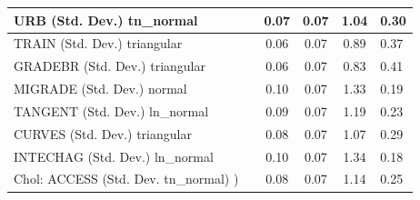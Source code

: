 \begin{table}
\begin{center}
\begin{tabular}{|l|l|c|c|c|l|}
			\hline
			URB (Std. Dev.) tn_normal &  & 0.07 & 0.07 & 1.04 & 0.30 \\
			\hline
			TRAIN (Std. Dev.) triangular &  & 0.06 & 0.07 & 0.89 & 0.37 \\
			\hline
			GRADEBR (Std. Dev.) triangular &  & 0.06 & 0.07 & 0.83 & 0.41 \\
			\hline
			MIGRADE (Std. Dev.) normal &  & 0.10 & 0.07 & 1.33 & 0.19 \\
			\hline
			TANGENT (Std. Dev.) ln_normal &  & 0.09 & 0.07 & 1.19 & 0.23 \\
			\hline
			CURVES (Std. Dev.) triangular &  & 0.08 & 0.07 & 1.07 & 0.29 \\
			\hline
			INTECHAG (Std. Dev.) ln_normal &  & 0.10 & 0.07 & 1.34 & 0.18 \\
			\hline
			 Chol: ACCESS (Std. Dev. tn_normal) ) &  & 0.08 & 0.07 & 1.14 & 0.25 \\
			\hline
		\end{tabular}
	\end{center}
\end{table}